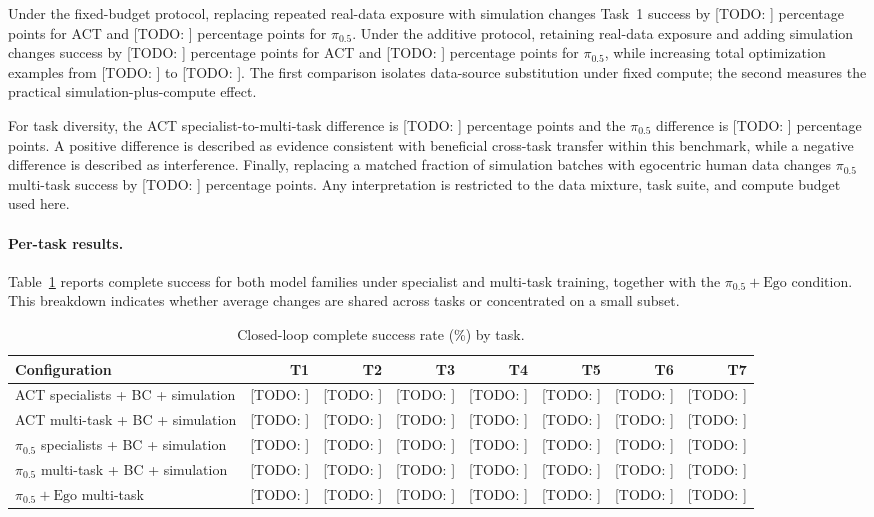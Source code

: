 \documentclass[10pt,conference]{IEEEtran}
\newcommand{\TODO}[1]{\textcolor{red!70!black}{[TODO: #1]}}
\begin{document}
Under the fixed-budget protocol, replacing repeated real-data exposure with
simulation changes Task~1 success by \TODO{} percentage points for ACT and
\TODO{} percentage points for $\pi_{0.5}$. Under the additive protocol,
retaining real-data exposure and adding simulation changes success by \TODO{}
percentage points for ACT and \TODO{} percentage points for $\pi_{0.5}$, while
increasing total optimization examples from \TODO{} to \TODO{}. The first
comparison isolates data-source substitution under fixed compute; the second
measures the practical simulation-plus-compute effect.

For task diversity, the ACT specialist-to-multi-task difference is \TODO{}
percentage points and the $\pi_{0.5}$ difference is \TODO{} percentage points.
A positive difference is described as evidence consistent with beneficial
cross-task transfer within this benchmark, while a negative difference is
described as interference. Finally, replacing a matched fraction of simulation
batches with egocentric human data changes $\pi_{0.5}$ multi-task success by
\TODO{} percentage points. Any interpretation is restricted to the data mixture,
task suite, and compute budget used here.

\paragraph{Per-task results.}
Table~\ref{tab:per-task} reports complete success for both model families under
specialist and multi-task training, together with the $\pi_{0.5}+\mathrm{Ego}$
condition. This breakdown indicates whether average changes are shared across
tasks or concentrated on a small subset.

\begin{table}[t]
\centering
\small
\caption{Closed-loop complete success rate (\%) by task.}
\label{tab:per-task}
\begin{tabular}{@{}lrrrrrrr@{}}
\toprule
Configuration & T1 & T2 & T3 & T4 & T5 & T6 & T7 \\
\midrule
ACT specialists + BC + simulation
& \TODO{} & \TODO{} & \TODO{} & \TODO{}
& \TODO{} & \TODO{} & \TODO{} \\

ACT multi-task + BC + simulation
& \TODO{} & \TODO{} & \TODO{} & \TODO{}
& \TODO{} & \TODO{} & \TODO{} \\

$\pi_{0.5}$ specialists + BC + simulation
& \TODO{} & \TODO{} & \TODO{} & \TODO{}
& \TODO{} & \TODO{} & \TODO{} \\

$\pi_{0.5}$ multi-task + BC + simulation
& \TODO{} & \TODO{} & \TODO{} & \TODO{}
& \TODO{} & \TODO{} & \TODO{} \\

$\pi_{0.5}+\mathrm{Ego}$ multi-task
& \TODO{} & \TODO{} & \TODO{} & \TODO{}
& \TODO{} & \TODO{} & \TODO{} \\
\bottomrule
\end{tabular}
\end{table}
\end{document}
